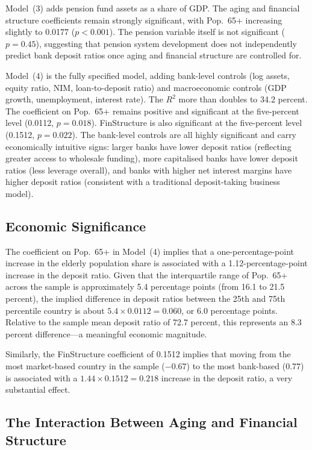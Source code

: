 \documentclass[12pt,a4paper]{article}
\begin{document}
Model~(3) adds pension fund assets as a share of GDP. The aging and financial structure coefficients remain strongly significant, with Pop.~65+ increasing slightly to 0.0177 ($p < 0.001$). The pension variable itself is not significant ($p = 0.45$), suggesting that pension system development does not independently predict bank deposit ratios once aging and financial structure are controlled for.

Model~(4) is the fully specified model, adding bank-level controls (log assets, equity ratio, NIM, loan-to-deposit ratio) and macroeconomic controls (GDP growth, unemployment, interest rate). The $R^2$ more than doubles to 34.2 percent. The coefficient on Pop.~65+ remains positive and significant at the five-percent level (0.0112, $p = 0.018$). FinStructure is also significant at the five-percent level (0.1512, $p = 0.022$). The bank-level controls are all highly significant and carry economically intuitive signs: larger banks have lower deposit ratios (reflecting greater access to wholesale funding), more capitalised banks have lower deposit ratios (less leverage overall), and banks with higher net interest margins have higher deposit ratios (consistent with a traditional deposit-taking business model).

\subsection{Economic Significance}

The coefficient on Pop.~65+ in Model~(4) implies that a one-percentage-point increase in the elderly population share is associated with a 1.12-percentage-point increase in the deposit ratio. Given that the interquartile range of Pop.~65+ across the sample is approximately 5.4 percentage points (from 16.1 to 21.5 percent), the implied difference in deposit ratios between the 25th and 75th percentile country is about $5.4 \times 0.0112 = 0.060$, or 6.0 percentage points. Relative to the sample mean deposit ratio of 72.7 percent, this represents an 8.3 percent difference---a meaningful economic magnitude.

Similarly, the FinStructure coefficient of 0.1512 implies that moving from the most market-based country in the sample ($-0.67$) to the most bank-based ($0.77$) is associated with a $1.44 \times 0.1512 = 0.218$ increase in the deposit ratio, a very substantial effect.

\subsection{The Interaction Between Aging and Financial Structure}
\end{document}
